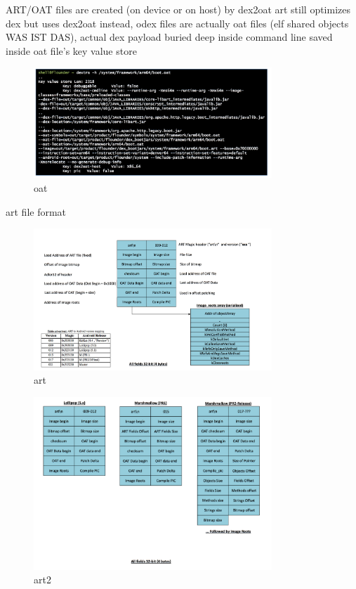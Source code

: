 ART/OAT files are created (on device or on host) by dex2oat
art still optimizes dex but uses dex2oat instead, odex files are actually oat files (elf shared objects WAS IST DAS), actual dex payload buried deep inside
command line saved inside oat file's key value store
\begin{figure}[h]
    \centering
    \includegraphics[width=0.8\textwidth]{data/oat.png}
    \caption{oat}
    \label{fig:oat}
\end{figure}
\newline

art file format
\begin{figure}[h]
    \centering
    \includegraphics[width=0.8\textwidth]{data/art.png}
    \caption{art}
    \label{fig:art}
\end{figure}
\begin{figure}[h]
    \centering
    \includegraphics[width=0.8\textwidth]{data/art2.png}
    \caption{art2}
    \label{fig:art2}
\end{figure}



